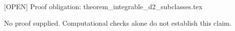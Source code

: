 \documentclass{article}
\begin{document}
[OPEN] Proof obligation: theorem\_integrable\_d2\_subclasses.tex

No proof supplied. Computational checks alone do not establish this claim.
\end{document}
